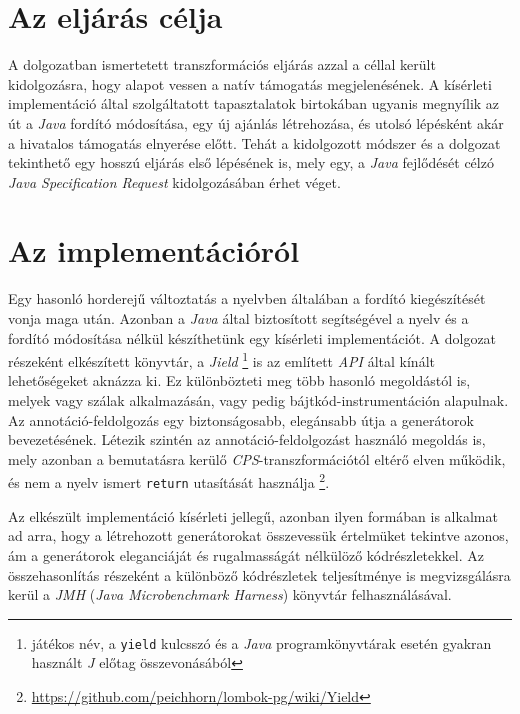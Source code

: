 \section{Az eljárás célja}

A dolgozatban ismertetett transzformációs eljárás azzal a céllal került kidolgozásra, hogy alapot vessen a natív támogatás megjelenésének. A kísérleti implementáció által szolgáltatott tapasztalatok birtokában ugyanis megnyílik az út a \textit{Java} fordító módosítása, egy új ajánlás létrehozása, és utolsó lépésként akár a hivatalos támogatás elnyerése előtt. 
Tehát a kidolgozott módszer és a dolgozat tekinthető egy hosszú eljárás első lépésének is, mely egy, a \textit{Java} fejlődését célzó \textit{Java Specification Request} kidolgozásában érhet véget. 

\section{Az implementációról}

Egy hasonló horderejű változtatás a nyelvben általában a fordító kiegészítését vonja maga után. Azonban a \textit{Java} által biztosított  segítségével a nyelv és a fordító módosítása nélkül készíthetünk egy kísérleti implementációt. A dolgozat részeként elkészített könyvtár, a \textit{Jield} \footnote{játékos név, a \texttt{yield} kulcsszó és a \textit{Java} programkönyvtárak esetén gyakran használt \textit{J} előtag összevonásából} is az említett \textit{API} által kínált lehetőségeket aknázza ki. Ez különbözteti meg több hasonló megoldástól is, melyek vagy szálak alkalmazásán, vagy pedig bájtkód-instrumentáción alapulnak. Az annotáció-feldolgozás egy biztonságosabb, elegánsabb útja a generátorok bevezetésének. Létezik szintén az annotáció-feldolgozást használó megoldás is, mely azonban a bemutatásra kerülő \textit{CPS}-transzformációtól eltérő elven működik, és nem a nyelv ismert \texttt{return} utasítását használja \footnote{\url{https://github.com/peichhorn/lombok-pg/wiki/Yield}}.

Az elkészült implementáció kísérleti jellegű, azonban ilyen formában is alkalmat ad arra, hogy a létrehozott generátorokat összevessük értelmüket tekintve azonos, ám a generátorok eleganciáját és rugalmasságát nélkülöző kódrészletekkel. Az összehasonlítás részeként a különböző kódrészletek teljesítménye is megvizsgálásra kerül a \textit{JMH} (\textit{Java Microbenchmark Harness}) könyvtár felhasználásával.
